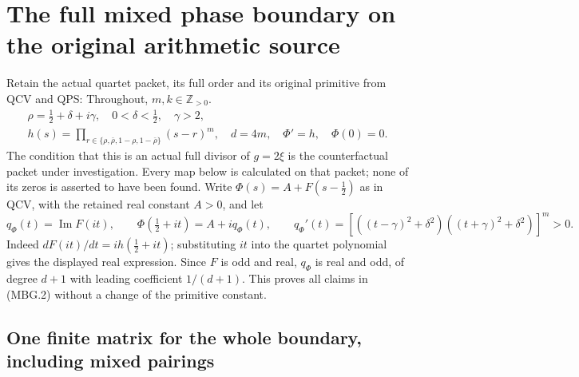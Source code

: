 \section{The full mixed phase boundary on the original arithmetic source}
\label{GraphV2:sec:mbg-source}

Retain the actual quartet packet, its full order and its original primitive
from QCV and QPS:
Throughout, \(m,k\in\mathbb Z_{>0}\).
\[
 \begin{gathered}
 \rho=\tfrac12+\delta+i\gamma,\quad
 0<\delta<\tfrac12,\quad\gamma>2,\\
 h(s)=\prod_{r\in\{\rho,\bar\rho,1-\rho,1-\bar\rho\}}(s-r)^m,
 \quad d=4m,\quad \Phi'=h,\quad\Phi(0)=0.
 \end{gathered}
 \tag{MBG.1}\label{GraphV2:eq:mbg-packet}
\]
The condition that this is an actual full divisor of \(g=2\xi\) is the
counterfactual packet under investigation. Every map below is calculated
on that packet; none of its zeros is asserted to have been found.
Write \(\Phi(s)=A+F(s-\tfrac12)\) as in QCV, with the retained real
constant \(A>0\), and let
\[
 q_\Phi(t)=\operatorname{Im}F(it),\qquad
 \Phi(\tfrac12+it)=A+iq_\Phi(t),\qquad
 q_\Phi'(t)=
 \left[((t-\gamma)^2+\delta^2)((t+\gamma)^2+\delta^2)\right]^m>0.
 \tag{MBG.2}\label{GraphV2:eq:mbg-line}
\]
Indeed \(dF(it)/dt=i h(\tfrac12+it)\); substituting \(it\) into the
quartet polynomial gives the displayed real expression. Since \(F\) is
odd and real, \(q_\Phi\) is real and odd, of degree \(d+1\) with leading
coefficient \(1/(d+1)\). This proves all claims in (MBG.2) without a
change of the primitive constant.

\subsection{One finite matrix for the whole boundary, including mixed pairings}

